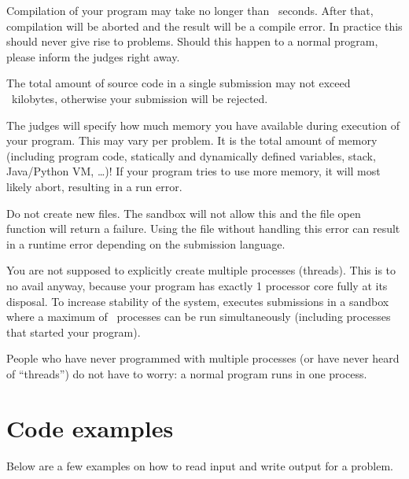 \begin{description}
\item[compile time]
Compilation of your program may take no longer than \COMPILETIME\
seconds. After that, compilation will be aborted and the result will
be a compile error. In practice this should never give rise to
problems. Should this happen to a normal program, please inform the
judges right away.

\item[source size]
The total amount of source code in a single submission may not exceed
\SOURCESIZE\ kilobytes, otherwise your submission will be rejected.

\item[memory]
The judges will specify how much memory you have available during execution of
your program. This may vary per problem.
It is the total amount of memory (including
program code, statically and dynamically defined variables, stack,
Java/Python VM, \dots)! If your program tries to use more memory, it will
most likely abort, resulting in a run error.

\item[creating new files]
Do not create new files. The sandbox will not allow this and the file open
function will return a failure. Using the file without handling this error can
result in a runtime error depending on the submission language.

\item[number of processes]
You are not supposed to explicitly create multiple processes (threads). This is
to no avail anyway, because your program has exactly 1 processor core fully
at its disposal. To increase stability of the system, \DOMjudge
executes submissions in a sandbox where a maximum of \PROCLIMIT\ processes
can be run simultaneously (including processes that started your program).

People who have never programmed with multiple processes (or have
never heard of ``threads'') do not have to worry: a normal program
runs in one process.

\end{description}

\newpage
\appendix

\section{Code examples}\label{codeexamples}

Below are a few examples on how to read input and write output for a
problem.


